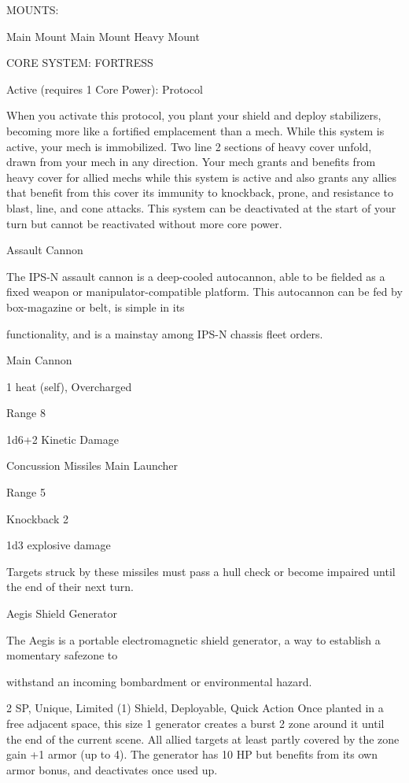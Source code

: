                                                     MOUNTS:

  Main Mount                         Main Mount                              Heavy Mount

                                          CORE SYSTEM: FORTRESS

  Active (requires 1 Core Power):
  Protocol

  When you activate this protocol, you plant your shield and deploy stabilizers, becoming more like a
  fortified emplacement than a mech. While this system is active, your mech is immobilized. Two line 2
  sections of heavy cover unfold, drawn from your mech in any direction. Your mech grants and benefits
  from heavy cover for allied mechs while this system is active and also grants any allies that benefit from
  this cover its immunity to knockback, prone, and resistance to blast, line, and cone attacks. This
  system can be deactivated at the start of your turn but cannot be reactivated without more core power.

Assault Cannon

The IPS-N assault cannon is a deep-cooled autocannon, able to be fielded as a fixed weapon or
manipulator-compatible platform. This autocannon can be fed by box-magazine or belt, is simple in its

functionality, and is a mainstay among IPS-N chassis fleet orders.

Main Cannon

1 heat (self), Overcharged

Range 8

1d6+2 Kinetic Damage





Concussion Missiles
Main Launcher

Range 5

Knockback 2

1d3 explosive damage

Targets struck by these missiles must pass a hull check or become impaired until the end of their
next turn.


Aegis Shield Generator

The Aegis is a portable electromagnetic shield generator, a way to establish a momentary safezone to

withstand an incoming bombardment or environmental hazard.

2 SP, Unique, Limited (1)
Shield, Deployable, Quick Action
Once planted in a free adjacent space, this size 1 generator creates a burst 2 zone around it until
the end of the current scene. All allied targets at least partly covered by the zone gain +1 armor
(up to 4). The generator has 10 HP but benefits from its own armor bonus, and deactivates once
used up.


